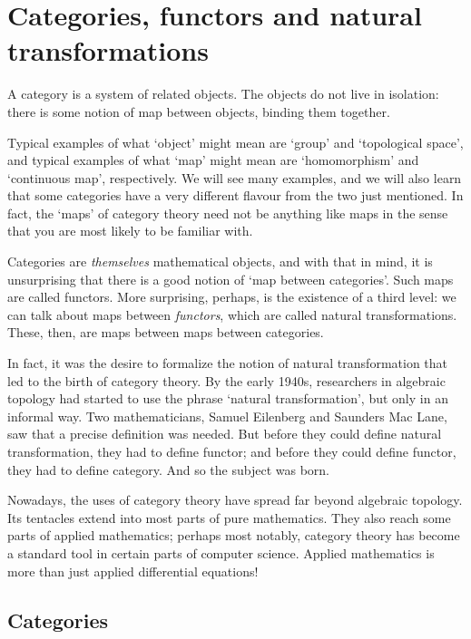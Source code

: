 \chapter{Categories, functors and natural transformations}
\label{ch:cfnt}

A category is a system of related objects.  The objects do not live in
isolation: there is some notion of map between objects, binding them
together.

Typical examples of what `object' might mean are `group' and `topological
space', and typical examples of what `map' might mean are `homomorphism'
and `continuous map', respectively.  We will see many examples, and we will
also learn that some categories have a very different flavour from the two
just mentioned.  In fact, the `maps' of category theory need not be
anything like maps in the sense that you are most likely to be familiar
with.

Categories are \emph{themselves} mathematical objects, and with that in
mind, it is unsurprising that there is a good notion of `map between
categories'.  Such maps are called functors.  More surprising, perhaps, is
the existence of a third level: we can talk about maps between
\emph{functors}, which are called natural transformations.  These, then,
are maps between maps between categories.

In fact, it was the desire to formalize the notion of natural
transformation that led to the birth of category theory.  By the early
1940s, researchers in algebraic topology had started to use the phrase
`natural transformation', but only in an informal way.  Two mathematicians,
Samuel Eilenberg%
%
%
and Saunders Mac Lane,%
%
%
saw that a precise definition was needed.  But before they could define
natural transformation, they had to define functor; and before they could
define functor, they had to define category.  And so the subject was born.

Nowadays, the uses of category theory have spread far beyond algebraic
topology.  Its tentacles extend into most parts of pure mathematics.  They
also reach some parts of applied mathematics; perhaps most notably,
category theory has become a standard tool in certain parts of computer%
%
%
science.  Applied%
%
% 
mathematics is more than just applied differential equations!



\section{Categories}
\label{sec:cats}


